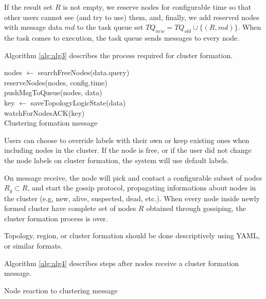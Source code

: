 \noindent
If the result set $R$ is not empty, we reserve nodes for configurable time so that other users cannot see (and try to use) them, and, finally, 
we add reserved nodes with message data $\mathit{md}$ to the task queue set $TQ_\mathit{new} =TQ_\mathit{old}\cup \{(R, md)\}.$ 
When the task comes to execution, the task queue sends messages to every node. 

Algorithm \ref{alg:alg3} describes the process required for cluster formation. 

\begin{algorithm}[H]
	\SetAlgoLined
	nodes $\leftarrow$ searchFreeNodes(data.query)\\
	reserveNodes(nodes, config.time)\\
	pushMsgToQueue(nodes, data)\\
	key $\leftarrow$ saveTopologyLogicState(data)\\
	watchForNodesACK(key)\\
	\caption{Clustering formation message}
	\label{alg:alg3}
\end{algorithm}

Users can choose to override labels with their own or keep existing ones when including nodes in the cluster. If the node is free, or if the user did not change the node labels on cluster formation, the system will use default labels.  

On message receive, the node will pick and contact a configurable subset of nodes $R_g \subset R$, and start the gossip protocol, propagating informations about nodes in the cluster (e.g, new, alive, suspected, dead, etc.). When every node inside newly formed cluster have complete set of nodes $R$ obtained through gossiping, the cluster formation process is over. 

Topology, region, or cluster formation should be done descriptively using YAML, or similar formats. 

Algorithm \ref{alg:alg4} describes steps after nodes receive a cluster formation message.

\begin{algorithm}[H]
	\SetAlgoLined
	\caption{Node reaction to clustering message}
	\label{alg:alg4}
\end{algorithm}

